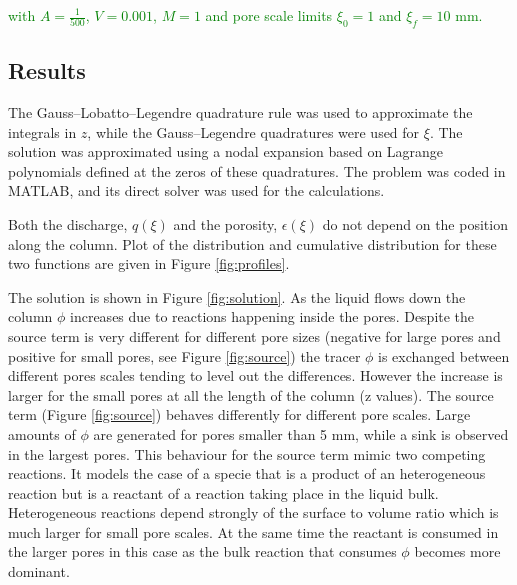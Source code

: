 \documentclass{CFD2011}
\newcommand{\TODO}[1]{\textcolor{blue}{TODO: #1} \\}
\newcommand{\newf}[1]{\textcolor{green}{#1}}
\begin{document}
\noindent \newf{with $A=\tfrac{1}{500}$, $V=0.001$, $M=1$ and pore scale limits $\xi_0=1$ and $\xi_f=10$ mm.}

\subsection{Results}
The Gauss--Lobatto--Legendre quadrature rule was used to approximate the integrals in $z$, while the Gauss--Legendre quadratures were used for $\xi$. The solution was approximated using a nodal expansion based on Lagrange polynomials defined at the zeros of these quadratures. The problem was coded in {MATLAB}, and its direct solver was used for the calculations.


Both the discharge, $q({\xi})$ and the porosity, $\epsilon({\xi})$ do not depend on the position along the column. Plot of the distribution and cumulative distribution for these two functions are given in Figure \ref{fig:profiles}.



The solution is shown in Figure \ref{fig:solution}. As the liquid flows down the column $\phi$ increases due to reactions happening inside the pores. Despite the source term is very different for different pore sizes (negative for large pores and positive for small pores, see Figure \ref{fig:source}) the tracer $\phi$ is exchanged between different pores scales tending to level out the differences. However the increase is larger for the small pores at all the length of the column (z values). The source term (Figure \ref{fig:source}) behaves differently for different pore scales. Large amounts of $\phi$ are generated for pores smaller than 5 mm, while a sink is observed in the largest pores. This behaviour for the source term mimic two competing reactions. It models the case of a specie that is a product of an heterogeneous reaction but is a reactant of a reaction taking place in the liquid bulk. Heterogeneous reactions depend strongly of the surface to volume ratio which is much larger for small pore scales. At the same time the reactant is consumed in the larger pores in this case as the bulk reaction that consumes $\phi$ becomes more dominant.
\end{document}
